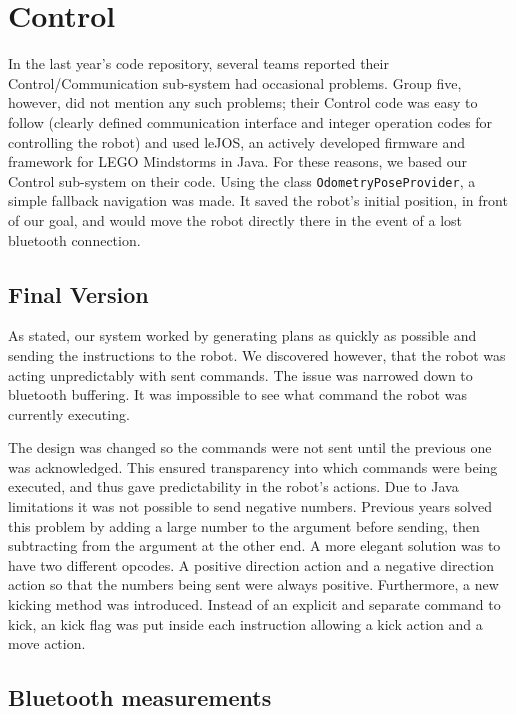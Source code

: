 \section{Control}
In the last year's code repository, several teams reported their
Control/Communication sub-system had occasional problems. Group five, however,
did not mention any such problems; their Control code was easy to follow
(clearly defined communication interface and integer operation codes for
controlling the robot) and used leJOS, an actively developed firmware and
framework for LEGO Mindstorms in Java. For these reasons, we based our Control
sub-system on their code.  Using the class \texttt{OdometryPoseProvider}, a
simple fallback navigation was made. It saved the robot's initial position, in
front of our goal, and would move the robot directly there in the event of a
lost bluetooth connection.
\subsection{Final Version}

As stated, our system worked by generating plans as quickly as possible and
sending the instructions to the robot. We discovered however, that the robot
was acting unpredictably with sent commands. The issue was narrowed down to
bluetooth buffering.  It was impossible to see what command the robot was
currently executing. 

The design was changed so the commands were not sent until the previous one was
acknowledged.  This ensured transparency into which commands were being
executed, and thus gave predictability in the robot's actions. Due to Java
limitations it was not possible to send negative numbers. Previous years solved
this problem by adding a large number  to the argument before sending, then
subtracting from the argument at the other end.  A more elegant solution was to
have two different opcodes. A positive direction action and a negative
direction action so that the numbers being sent were always positive.
Furthermore, a new kicking method was introduced. Instead of an explicit and
separate command to kick, an kick flag was put inside each instruction allowing
a kick action and a move action. 

\subsection{Bluetooth measurements}

